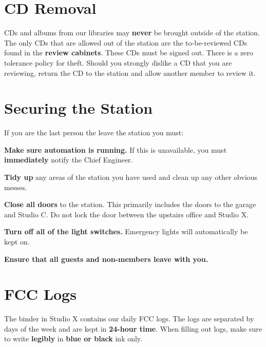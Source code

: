 \documentclass{witrman}
\begin{document}
\section{CD Removal}
CDs and albums from our libraries may \textbf{never} be brought outside of the
station.  The only CDs that are allowed out of the station are the
to-be-reviewed CDs found in the \textbf{review cabinets}. These CDs must be
signed out.  There is a zero tolerance policy for theft. Should you strongly
dislike a CD that you are reviewing, return the CD to the station and allow
another member to review it.

\section{Securing the Station}
If you are the last person the leave the station you must:
\begin{skinnyenumerate}
    \item \textbf{Make sure automation is running.} If this is unavailable, you
        must \textbf{immediately} notify the Chief Engineer.
    \item \textbf{Tidy up} any areas of the station you have used and clean up
        any other obvious messes.
    \item \textbf{Close all doors} to the station. This primarily includes the
        doors to the garage and Studio C. Do not lock the door between the
        upstairs office and Studio X.
    \item \textbf{Turn off all of the light switches.} Emergency lights will
        automatically be kept on.
    \item \textbf{Ensure that all guests and non-members leave with you.}
\end{skinnyenumerate}

\section{FCC Logs}
The binder in Studio X contains our daily FCC logs. The logs are separated by
days of the week and are kept in \textbf{24-hour time}. When filling out logs,
make sure to write \textbf{legibly} in \textbf{blue or black} ink only.
\end{document}

